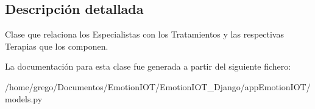 \subsection{Descripción detallada}
Clase que relaciona los Especialistas con los Tratamientos y las respectivas Terapias que los componen. 

La documentación para esta clase fue generada a partir del siguiente fichero\+:\begin{DoxyCompactItemize}
\item 
/home/grego/\+Documentos/\+Emotion\+I\+O\+T/\+Emotion\+I\+O\+T\+\_\+\+Django/app\+Emotion\+I\+O\+T/models.\+py\end{DoxyCompactItemize}
